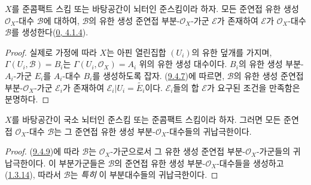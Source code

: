 \begin{proposition}[9.6.5]
\label{I.9.6.5-ko}
$X$를 준콤팩트 스킴 또는 바탕공간이 뇌터인 준스킴이라 하자.
모든 준연접 유한 생성 $\mathscr{O}_X$-대수 $\mathscr{B}$에 대하여,
$\mathscr{B}$의 유한 생성 준연접 부분-$\mathscr{O}_X$-가군
$\mathscr{E}$가 존재하여 $\mathscr{E}$가 $\mathscr{O}_X$-대수
$\mathscr{B}$를 생성한다(\hyperref[0.4.1.4-ko]{0, 4.1.4}).
\end{proposition}

\begin{proof}
실제로 가정에 따라 $X$는 아핀 열린집합 $(U_i)$의 유한 덮개를 가지며,
$\Gamma(U_i,\mathscr{B})=B_i$는 $\Gamma(U_i,\mathscr{O}_X)=A_i$ 위의
유한 생성 대수이다. $B_i$의 유한 생성 부분-$A_i$-가군 $E_i$를
$A_i$-대수 $B_i$를 생성하도록 잡자. (\hyperref[I.9.4.7-ko]{9.4.7})에
따르면, $\mathscr{B}$의 유한 생성 준연접 부분-$\mathscr{O}_X$-가군
$\mathscr{E}_i$가 존재하여 $\mathscr{E}_i|U_i=\widetilde{E_i}$이다.
$\mathscr{E}_i$들의 합 $\mathscr{E}$가 요구된 조건을 만족함은 분명하다.
\end{proof}

\begin{proposition}[9.6.6]
\label{I.9.6.6-ko}
$X$를 바탕공간이 국소 뇌터인 준스킴 또는 준콤팩트 스킴이라 하자.
그러면 모든 준연접 $\mathscr{O}_X$-대수 $\mathscr{B}$는 그 준연접 유한
생성 부분-$\mathscr{O}_X$-대수들의 귀납극한이다.
\end{proposition}

\begin{proof}
(\hyperref[I.9.4.9-ko]{9.4.9})에 따라 $\mathscr{B}$는
$\mathscr{O}_X$-가군으로서 그 유한 생성 준연접
부분-$\mathscr{O}_X$-가군들의 귀납극한이다. 이 부분가군들은
$\mathscr{B}$의 준연접 유한 생성 부분-$\mathscr{O}_X$-대수들을 생성하고
(\hyperref[I.1.3.14-ko]{1.3.14}), 따라서 $\mathscr{B}$는
\emph{특히} 이 부분대수들의 귀납극한이다.
\end{proof}
